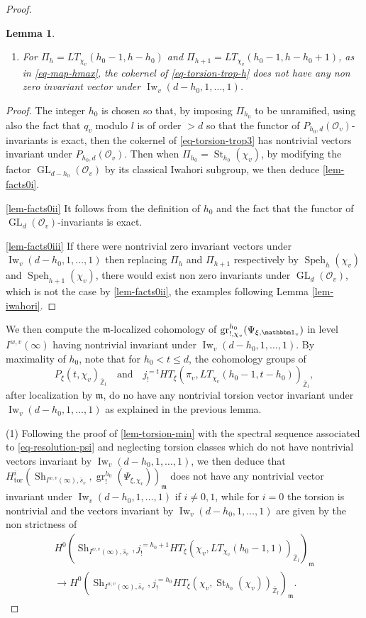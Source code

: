 \documentclass[JEP,XML,SOM,Unicode,published]{cedram}
\let\mathds\mathbbm
\newenvironment{enumeratei}
{\bgroup\def\theenumi{\roman{enumi}}\def\theenumii{\arabic{enumii}}\begin{enumerate}}
{\end{enumerate}\egroup}
\DeclareMathOperator{\GL}{GL}
\newcommand{\tor}{\mathrm{tor}}
\theoremstyle{plain}
\newtheorem{lemma}[equation]{Lemma}
\theoremstyle{definition}
\numberwithin{equation}{subsection}
\newcommand\Zm{{\mathbb Z}}
\newcommand\OC{{\mathcal O}}
\DeclareMathOperator{\sh}{Sh}
\DeclareMathOperator{\Iw}{Iw}
\DeclareMathOperator{\speh}{Speh}
\DeclareMathOperator{\st}{St}
\DeclareMathOperator{\gr}{gr}
\let \oo=\infty
\begin{document}
\begin{proof}
\begin{lemma}
\begin{enumeratei}
\item\label{lem-facts0iii} For $\Pi_h=LT_{\chi_v}(h_0-1,h-h_0)$ and
$\Pi_{h+1}=LT_{\chi_v}(h_0-1,h-h_0+1)$, as in \eqref{eq-map-hmax},
the cokernel of \eqref{eq-torsion-trop-h} does not have any non zero invariant vector under
$\Iw_v(d-h_0,1,\dots,1)$.
\end{enumeratei}
\end{lemma}

\begin{proof}
The integer $h_0$ is chosen so that, by imposing $\Pi_{h_0}$ to be unramified,
using also the fact that $q_v$ modulo $l$ is of order $>d$ so that the functor of $P_{h_0,d}(\OC_v)$-invariants is exact,
then the cokernel of \eqref{eq-torsion-trop3}
has nontrivial vectors invariant under $P_{h_0,d}(\OC_v)$.
Then when $\Pi_{h_0}=\st_{h_0}(\chi_v)$, by modifying the factor
$\GL_{d-h_0}(\OC_v)$ by its classical Iwahori subgroup, we then deduce \eqref{lem-facts0i}.

\eqref{lem-facts0ii} It follows from the definition of $h_0$ and the fact that
the functor of $\GL_d(\OC_v)$-invariants is exact.

\eqref{lem-facts0iii} If there were nontrivial zero invariant vectors under $\Iw_v(d-h_0,1,\dots,1)$
then replacing $\Pi_h$ and $\Pi_{h+1}$ respectively by $\speh_h(\chi_v)$ and
$\speh_{h+1}(\chi_v)$, there would exist non zero invariants under
$\GL_d(\OC_v)$, which is not the case by \eqref{lem-facts0ii}, \cf the examples following
Lemma \ref{lem-iwahori}.
\end{proof}

We then compute the $\mathfrak m$-localized cohomology of
$\gr^{h_0}_{!,\chi_v}(\Psi_{\xi,\mathds 1_v})$
in level $I^{w,v}(\oo)$ having nontrivial invariant under
$\Iw_v(d-h_0,1,\dots,1)$.
By maximality of $h_0$, note that for $h_0<t \leq d$, the cohomology groups of
\[
P_\xi(t,\chi_v)_{\overline \Zm_l}\quad\text{and}\quad j^{=t}_! HT_\xi(\pi_v,LT_{\chi_v}(h_0-1,t-h_0))_{\overline \Zm_l},
\]
after localization by $\mathfrak m$, do no
have any nontrivial torsion vector invariant under \hbox{$\Iw_v(d-h_0,1,\dots,1)$}
as explained in the previous lemma.

(1) Following the proof of \ref{lem-torsion-min} with the spectral sequence
associated to
\eqref{eq-resolution-psi} and neglecting torsion classes
which do not have nontrivial vectors invariant by \hbox{$\Iw_v(d-h_0,1,\dots,1)$},
we then deduce that
$H^i_{\tor}(\sh_{I^{w,v}(\oo),\bar s_v},
\gr^{h_0}_{!}(\Psi_{\xi,\chi_v}))_{\mathfrak m}$ does not have any nontrivial vector invariant under $\Iw_v(d-h_0,1,\dots,1)$ if $i \neq 0,1$,
while for $i=0$ the torsion is nontrivial and the
vectors invariant by $\Iw_v(d-h_0,1,\dots,1)$ are given by the non strictness of
\begin{multline} \label{eq-torsion-trop}
H^{0}(\sh_{I^{w,v}(\oo),\bar s_v},j^{=h_0+1}_! HT_\xi(\chi_v,LT_{\chi_v}(h_0-1,1))_{\overline \Zm_l})_{\mathfrak m} \\
\to H^0(\sh_{I^{w,v}(\oo),\bar s_v},j^{=h_0}_!
HT_\xi(\chi_v,\st_{h_0}(\chi_v))_{\overline \Zm_l})_{\mathfrak m}.
\end{multline}


\end{proof}
\end{document}
